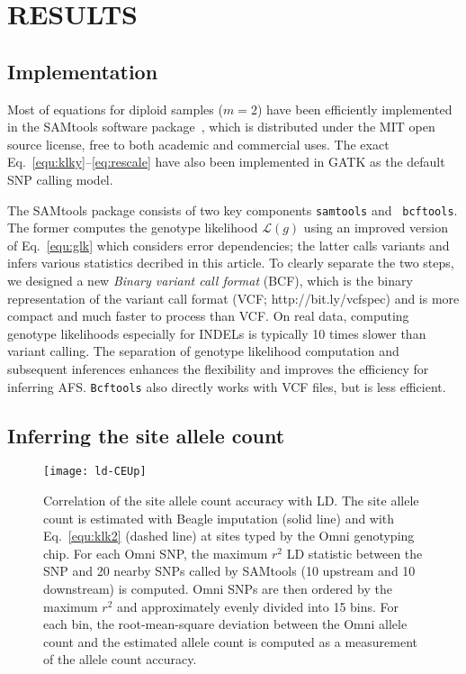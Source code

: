\documentclass{bioinfo}
\begin{document}
\section{RESULTS}
\subsection{Implementation}
Most of equations for diploid samples ($m=2$) have been efficiently implemented
in the SAMtools software package~\citep{Li:2009ys}, which is distributed under
the MIT open source license, free to both academic and commercial uses. The
exact Eq.~\eqref{equ:klky}--\eqref{eq:rescale} have also been implemented in
GATK as the default SNP calling model.

The SAMtools package consists of two key components {\tt samtools} and {\tt
bcftools}.  The former computes the genotype likelihood $\mathcal{L}(g)$ using
an improved version of Eq.~\eqref{equ:glk} which considers error dependencies;
the latter calls variants and infers various statistics decribed in this
article. To clearly separate the two steps, we designed a new \emph{Binary
variant call format} (BCF), which is the binary representation of the variant
call format (VCF; http://bit.ly/vcfspec) and is more compact and much faster to
process than VCF.  On real data, computing genotype likelihoods especially for
INDELs is typically 10 times slower than variant calling. The separation of
genotype likelihood computation and subsequent inferences enhances the
flexibility and improves the efficiency for inferring AFS. {\tt Bcftools} also
directly works with VCF files, but is less efficient.

\subsection{Inferring the site allele count}

\begin{figure}[!htb]
\centering
\texttt{[image: ld-CEUp]}
\caption{Correlation of the site allele count accuracy with LD. The site allele
count is estimated with Beagle imputation (solid line) and with
Eq.~\eqref{equ:klk2} (dashed line) at sites typed by the Omni genotyping chip.
For each Omni SNP, the maximum $r^2$ LD statistic between the SNP and
20 nearby SNPs called by SAMtools (10 upstream and 10 downstream) is computed.
Omni SNPs are then ordered by the maximum $r^2$ and approximately evenly
divided into 15 bins.  For each bin, the root-mean-square deviation between the
Omni allele count and the estimated allele count is computed as a measurement
of the allele count accuracy.}\label{fig:ac}
\end{figure}
\end{document}

